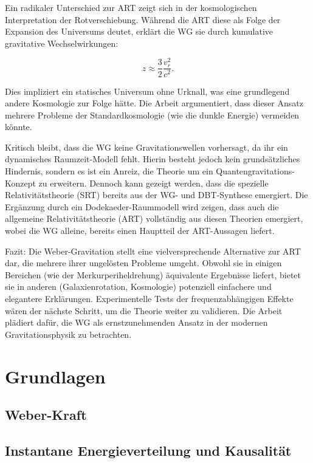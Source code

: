 \documentclass{book}
\numberwithin{equation}{section}
\begin{document}
Ein radikaler Unterschied zur ART zeigt sich in der kosmologischen Interpretation der Rotverschiebung. Während die ART diese als Folge der Expansion des Universums deutet,
erklärt die WG sie durch kumulative gravitative Wechselwirkungen:

\[
z \approx \frac{3}{2} \frac{v_r^2}{c^2}.
\]  

Dies impliziert ein statisches Universum ohne Urknall, was eine grundlegend andere Kosmologie zur Folge hätte. Die Arbeit argumentiert, dass dieser Ansatz mehrere Probleme
der Standardkosmologie (wie die dunkle Energie) vermeiden könnte.  

Kritisch bleibt, dass die WG keine Gravitationswellen vorhersagt, da ihr ein dynamisches Raumzeit-Modell fehlt. Hierin besteht jedoch kein grundsätzliches Hindernis,
sondern es ist ein Anreiz, die Theorie um ein Quantengravitations-Konzept zu erweitern. Dennoch kann gezeigt werden, dass die spezielle Relativitätstheorie (SRT)
bereits aus der WG- und DBT-Synthese emergiert. Die Ergänzung durch ein Dodekaeder-Raummodell wird zeigen, dass auch die allgemeine Relativitätstheorie (ART) vollständig aus diesen
Theorien emergiert, wobei die WG alleine, bereits einen Hauptteil der ART-Aussagen liefert.

Fazit: Die Weber-Gravitation stellt eine vielversprechende Alternative zur ART dar, die mehrere ihrer ungelösten Probleme umgeht. Obwohl sie in einigen Bereichen
(wie der Merkurperiheldrehung) äquivalente Ergebnisse liefert, bietet sie in anderen (Galaxienrotation, Kosmologie) potenziell einfachere und elegantere Erklärungen.
Experimentelle Tests der frequenzabhängigen Effekte wären der nächste Schritt, um die Theorie weiter zu validieren. Die Arbeit plädiert dafür, die WG als
ernstzunehmenden Ansatz in der modernen Gravitationsphysik zu betrachten.

\tableofcontents

\part{Grundlagen}
\chapter{Weber-Kraft}
\label{chapter:weber_kraft}





\chapter{Instantane Energieverteilung und Kausalität}

\end{document}

